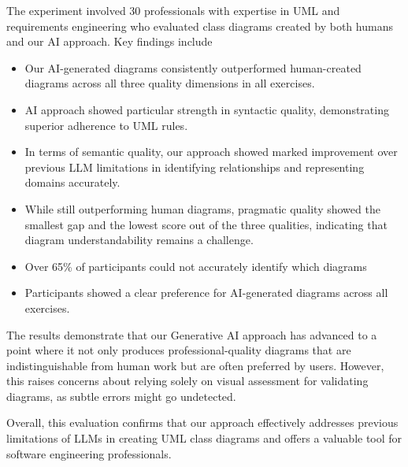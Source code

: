 The experiment involved 30 professionals with expertise in UML and requirements 
engineering who evaluated class diagrams created by both humans and our AI 
approach. Key findings include
\begin{itemize}
    \item Our AI-generated diagrams consistently outperformed human-created diagrams across all three quality dimensions in all exercises.
    \item AI approach showed particular strength in syntactic quality, demonstrating superior adherence to UML rules.
    \item In terms of semantic quality, our approach showed marked improvement over previous LLM limitations in identifying relationships and representing domains accurately.
    \item While still outperforming human diagrams, pragmatic quality showed the smallest gap and the lowest score out of the three qualities, indicating that diagram understandability remains a challenge.
    \item Over 65\% of participants could not accurately identify which diagrams
    \item Participants showed a clear preference for AI-generated diagrams across all exercises.
\end{itemize} 

The results demonstrate that our Generative AI approach has advanced to a 
point where it not only produces professional-quality diagrams that are 
indistinguishable from human work but are often preferred by users. However, 
this raises concerns about relying solely on visual assessment for validating 
diagrams, as subtle errors might go undetected.

Overall, this evaluation confirms that our approach effectively addresses 
previous limitations of LLMs in creating UML class diagrams and offers a valuable 
tool for software engineering professionals.